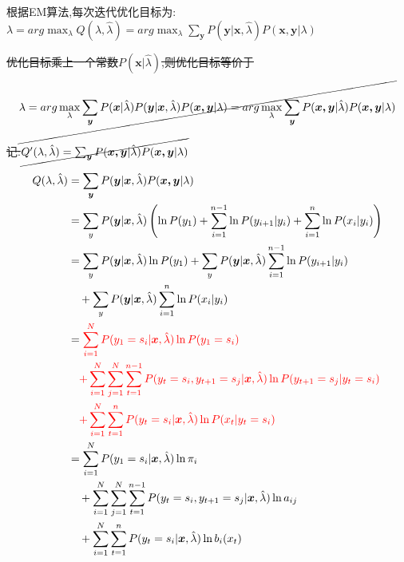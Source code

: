\documentclass[UTF8,a4paper]{ctexart}%
\begin{document}
            根据EM算法,每次迭代优化目标为:
            $\lambda = arg \max_{\lambda} Q(\lambda , \hat{\lambda}) = arg \max_{\lambda} \sum_{\bm{y}} P(\bm{y}|\bm{x},\hat{\lambda})P(\bm{x,y}|\lambda)$

            \sout{优化目标乘上一个常数$P(\bm{x}|\hat{\lambda})$,则优化目标等价于}
              \[ \cancel{\lambda = arg \max_{\lambda} \sum_{\bm{y}} P(\bm{x}|\hat{\lambda})P(\bm{y}|\bm{x},\hat{\lambda})P(\bm{x,y}|\lambda) = arg \max_{\lambda} \sum_{\bm{y}} P(\bm{x,y}|\hat{\lambda})P(\bm{x,y}|\lambda)} \]

            \sout{记:}$\cancel{Q'(\lambda,\hat{\lambda}) = \sum_{\bm{y}} P(\bm{x,y}|\hat{\lambda})P(\bm{x,y}|\lambda)}$

            \begin{align}
              Q(\lambda,\hat{\lambda}) &= \sum_{\bm{y}} P(\bm{y}|\bm{x},\hat{\lambda})P(\bm{x,y}|\lambda)\\
                &= \sum_{y} P(\bm{y}|\bm{x},\hat{\lambda}) \left( \ln P(y_1) + \sum_{i = 1}^{n-1} \ln P(y_{i+1}|y_{i}) + \sum_{i = 1}^n \ln P(x_i|y_i) \right )\\
                &= \sum_{y} P(\bm{y}|\bm{x},\hat{\lambda}) \ln P(y_1)
                  + \sum_{y} P(\bm{y}|\bm{x},\hat{\lambda})  \sum_{i = 1}^{n-1} \ln P(y_{i+1}|y_{i})\\
                  &\quad + \sum_{y} P(\bm{y}|\bm{x},\hat{\lambda}) \sum_{i = 1}^n \ln P(x_i|y_i) \notag \\
                &= {\color{red}
                \sum_{i = 1}^N  P(y_1 = s_i|\bm{x},\hat{\lambda}) \ln P(y_1 = s_i)}\\
                  &\quad{\color{red}
                  + \sum_{i = 1}^N \sum_{j = 1}^N \sum_{t = 1}^{n-1}
                       P(y_t = s_i , y_{t+1} = s_j|\bm{x},\hat{\lambda}) \ln P(y_{t+1} = s_j|y_{t} = s_i)} \notag \\
                  &\quad{\color{red}
                   + \sum_{i = 1}^N \sum_{t = 1}^n P(y_t = s_i|\bm{x},\hat{\lambda}) \ln P(x_t|y_t = s_i)} \notag \\
                &= \sum_{i = 1}^N  P(y_1 = s_i|\bm{x},\hat{\lambda}) \ln \pi_i\\
                  &\quad+ \sum_{i = 1}^N \sum_{j = 1}^N \sum_{t = 1}^{n-1}
                      P(y_t = s_i , y_{t+1} = s_j|\bm{x},\hat{\lambda}) \ln a_{ij} \notag\\
                  &\quad + \sum_{i = 1}^N \sum_{t = 1}^n P(y_t = s_i|\bm{x},\hat{\lambda}) \ln b_i(x_t) \notag
            \end{align}
\end{document}
